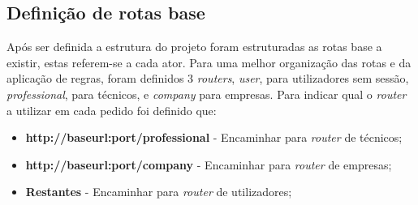 \subsection{Definição de rotas base}
Após ser definida a estrutura do projeto foram estruturadas as rotas base a existir, estas referem-se a cada ator. Para uma melhor organização das rotas e da aplicação de regras, foram definidos 3 \textit{routers}, \textit{user}, para utilizadores sem sessão, \textit{professional}, para técnicos, e \textit{company} para empresas. Para indicar qual o \textit{router} a utilizar em cada pedido foi definido que:
\begin{itemize}
  \item \textbf{http://baseurl:port/professional} - Encaminhar para \textit{router} de técnicos;
  \item \textbf{http://baseurl:port/company} - Encaminhar para \textit{router} de empresas;
  \item \textbf{Restantes} - Encaminhar para \textit{router} de utilizadores;
\end{itemize}
